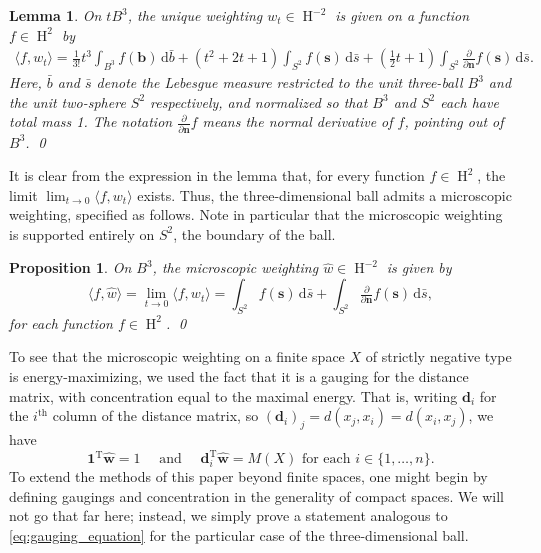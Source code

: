 \documentclass[a4paper, oneside, reqno]{amsart}
\newtheorem{lemma}[theorem]{Lemma}
\newtheorem{prop}[theorem]{Proposition}
\theoremstyle{definition}
\theoremstyle{remark}
\numberwithin{equation}{section}
\renewcommand{\vec}{\mathbf}
\renewcommand{\th}{\text{th}}
\newcommand{\onevector}{\mathbf{1}}
\newcommand{\transpose}{\mathrm{T}}
\newcommand{\dd}{\mathrm{d}} %
\newcommand{\micro}{\widehat{\vec{w}}}
\newcommand{\dispair}[2]{\langle #2,#1 \rangle}
\DeclareMathOperator{\besselspace}{H}
\begin{document}
\begin{lemma}
On \(t B^3\), the unique weighting \(w_t \in \besselspace^{-2}\) is given on a function \(f \in \besselspace^2\) by
\begin{multline*}
    \dispair{w_t}{f}
    =
    \tfrac{1}{3!} t^3 \int_{B^3} f(\vec{b}) \,\dd \bar{b}
    +
    (t^2 + 2t + 1)
    \int_{S^2} f(\vec{s}) \,\dd \bar{s}
    +
    (\tfrac{1}{2}t + 1)
    \int_{S^2} \tfrac{\partial}{\partial \vec{n}} f(\vec{s}) \,\dd \bar{s}
    .
\end{multline*}
Here, \(\bar{b}\) and \(\bar{s}\) denote the Lebesgue measure restricted to the unit three-ball \(B^3\) and the unit two-sphere \(S^2\) respectively, and normalized so that \(B^3\) and \(S^2\) each have total mass 1. The notation \(\frac{\partial}{\partial \vec{n}} f\) means the normal derivative of \(f\), pointing out of \(B^3\). \qed
\end{lemma}

It is clear from the expression in the lemma that, for every function \(f \in \besselspace^2\), the limit \(\lim_{t \to 0} \dispair{w_t}{f}\) exists. Thus, the three-dimensional ball admits a microscopic weighting, specified as follows. Note in particular that the microscopic weighting is supported entirely on \(S^2\), the boundary of the ball.

\begin{prop}
\label{prop:microwtg-on-B3}
On \(B^3\), the microscopic weighting  \(\widehat{w} \in \besselspace^{-2}\) is given by
\[
    \dispair{\widehat{w}}{f}
    =
    \lim_{t \to 0}
    \dispair{w_t}{f}
    =
    \int_{S^2} f(\vec{s}) \,\dd \bar{s}
    +
    \int_{S^2} \tfrac{\partial}{\partial \vec{n}} f(\vec{s}) \,\dd \bar{s},
\]
for each function \(f \in \besselspace^2\). 
\qed
\end{prop}

To see that the microscopic weighting on a finite space \(X\) of strictly negative type is energy-maximizing, we used the fact that it is a gauging for the distance matrix, with concentration equal to the maximal energy. That is, writing \(\vec{d}_i\) for the \(i^\th\) column of the distance matrix, so \((\vec{d}_i)_j = d(x_j,x_i) = d(x_i,x_j)\), we have 
\begin{equation}
\label{eq:gauging_equation}
    \onevector^\transpose \micro = 1 \quad \text{ and } \quad \vec{d}_i^\transpose \micro = M(X) \text{ for each } i \in \{1,\ldots, n\}.
\end{equation} 
To extend the methods of this paper beyond finite spaces, one might begin by defining gaugings and concentration in the generality of compact spaces. We will not go that far here; instead, we simply prove a statement analogous to \eqref{eq:gauging_equation} for the particular case of the three-dimensional ball.
\end{document}
